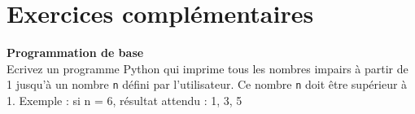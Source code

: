 	\newpage
	

\section{Exercices complémentaires}

\begin{Exercice}[10 minutes] \textbf{Programmation de base}\\
	Ecrivez un programme Python qui imprime tous les nombres impairs à partir de 1 jusqu’à un nombre \lstinline{n} défini par l’utilisateur. Ce nombre \lstinline{n} doit être supérieur à 1.
	Exemple : si n = 6, résultat attendu : 1, 3, 5
	\begin{solution}
   		 
	\end{solution}
\end{Exercice}



